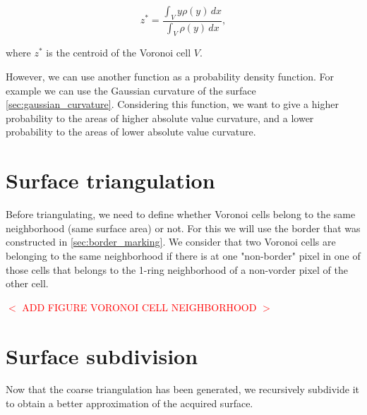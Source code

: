 \documentclass[11pt,fleqn]{book} %
\newcommand{\arnaud}[1]{\textcolor{red}{$<$ #1 $>$}}
\begin{document}
\begin{equation}
	z^* = \frac{\int_V y\rho(y)\,dx}{\int_V \rho(y)\,dx},
\end{equation}

where $z^*$ is the centroid of the Voronoi cell $V$.

However, we can use another function as a probability density function. For example we can use the Gaussian curvature of the surface \ref{sec:gaussian_curvature}.
Considering this function, we want to give a higher probability to the areas of higher absolute value curvature, and a lower probability to the areas of lower absolute value curvature.

\section{Surface triangulation}
\label{sec:surface_triangulation}
Before triangulating, we need to define whether Voronoi cells belong to the same neighborhood (same surface area) or not. 
For this we will use the border that was constructed in \ref{sec:border_marking}.
We consider that two Voronoi cells are belonging to the same neighborhood if there is at one "non-border" pixel in one of those cells that belongs to the 1-ring neighborhood of a non-vorder pixel of the other cell.

\arnaud{ADD FIGURE VORONOI CELL NEIGHBORHOOD}

\section{Surface subdivision}
\label{sec:surface_subdivision}
Now that the coarse triangulation has been generated, we recursively subdivide it to obtain a better approximation of the acquired surface.





\printindex
\end{document}
